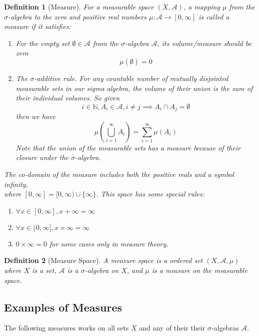 \documentclass{article}
\newtheorem{defi}{Definition}[section]
\begin{document}
\begin{defi}[Measure]
    For a measurable space $(X, \mathcal A)$, a mapping $\mu$ from the $\sigma$-algebra to the zero and positive real numbers $\mu \colon \mathcal A \to [0, \infty]$ is called a measure if it satisfies:
    \begin{enumerate}
        \item For the empty set $\emptyset \in \mathcal A$ from the $\sigma$-algebra $\mathcal A$, its volume/measure should be zero
        \[
            \mu(\emptyset) = 0
        \]
        \item The $\sigma$-additive rule. For any countable number of mutually disjointed measurable sets in our sigma algebra, the volume of their union is the sum of their individual volumes. So given
        \[
            i \in \mathbb{N}, A_i \in \mathcal A, i \neq j \implies A_i \cap A_j = \emptyset
        \]
        then we have
        \[
            \mu(\bigcup_{i=1}^{\infty} A_i) = \sum_{i=1}^{\infty} \mu(A_i)
        \]
        Note that the union of the measurable sets has a measure because of their closure under the $\sigma$-algebra.
    \end{enumerate}

    The co-domain of the measure includes both the positive reals and a symbol infinity, \\ where $[0, \infty] = [0, \infty) \cup  \{\infty\}$. This space has some special rules:
    \begin{enumerate}
        \item $\forall x \in [0, \infty], x + \infty = \infty$
        \item $\forall x \in (0, \infty], x \times \infty = \infty$
        \item $0 \times \infty = 0$ for some cases only in measure theory.
    \end{enumerate}
\end{defi}


\begin{defi}[Measure Space]
    A measure space is a ordered set $(X, \mathcal A, \mu)$ where $X$ is a set, $\mathcal A$ is a $\sigma$-algebra on $X$, and $\mu$ is a measure on the measurable space.
\end{defi}

\subsection{Examples of Measures}
The following measures works on all sets $X$ and any of their their $\sigma$-algebras $\mathcal A$.
\end{document}
